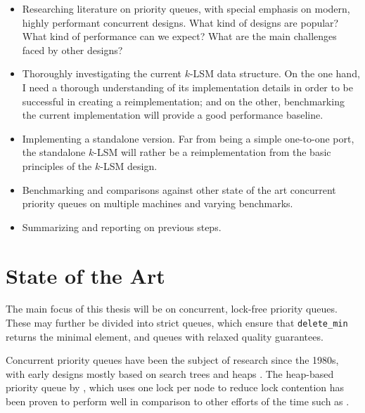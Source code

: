 \documentclass[a4paper,10pt]{article}
\begin{document}
\begin{itemize}
    \item Researching literature on priority queues, with special emphasis on
        modern, highly performant concurrent designs. What kind of designs
        are popular? What kind of performance can we expect? What are the
        main challenges faced by other designs?
    \item Thoroughly investigating the current $k$-LSM data structure. On
        the one hand, I need a thorough understanding of its implementation
        details in order to be successful in creating a reimplementation; and
        on the other, benchmarking the current implementation will provide a
        good performance baseline.
    \item Implementing a standalone version. Far from being a simple one-to-one
        port, the standalone $k$-LSM will rather be a reimplementation from
        the basic principles of the $k$-LSM design.
    \item Benchmarking and comparisons against other state of the art concurrent
        priority queues on multiple machines and varying benchmarks.
    \item Summarizing and reporting on previous steps.
\end{itemize}

\section{State of the Art}

The main focus of this thesis will be on concurrent, lock-free priority queues.
These may further be divided into strict queues, which ensure that \lstinline|delete_min|
returns the minimal element, and queues with relaxed quality guarantees.


Concurrent priority queues have been the subject of research since the 1980s, with
early designs mostly based on search trees \cite{boyar1994chromatic,johnson1991highly} and
heaps \cite{ayani1990lr,biswas1987simultaneous,das1996distributed,deo1992parallel,huang1991evaluation,
luchetti1993some,mans1998portable,olariu1991optimal,prasad1995parallel}. The heap-based
priority queue by \citeauthor{hunt1996efficient} \cite{hunt1996efficient}, which uses one lock
per node to reduce lock contention has been proven to
perform well \cite{shavit2000skiplist} in comparison to other efforts of the time such as
\cite{nageshwara1988concurrent,ayani1990lr,yan1998lock}.
\end{document}
